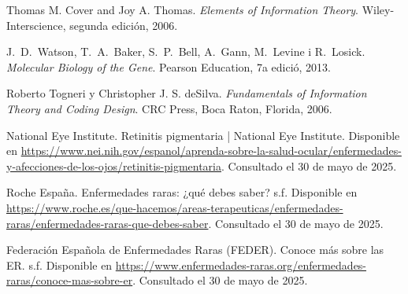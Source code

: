 \documentclass[11pt,spanish,listoffigures,listoftables]{tfgetsinf}
\begin{document}
\begin{thebibliography}{99}



   

   Thomas M. Cover and Joy A. Thomas.  
   \newblock \textit{Elements of Information Theory}.  
   \newblock Wiley-Interscience, segunda edición, 2006.

   J.~D.~Watson, T.~A.~Baker, S.~P.~Bell, A.~Gann, M.~Levine i R.~Losick.
   \newblock \textit{Molecular Biology of the Gene}.
   \newblock Pearson Education, 7a edició, 2013.
   
   Roberto Togneri y Christopher J. S. deSilva.  
   \newblock \textit{Fundamentals of Information Theory and Coding Design}.  
   \newblock CRC Press, Boca Raton, Florida, 2006.


   National Eye Institute.  
   \newblock Retinitis pigmentaria | National Eye Institute.  
   \newblock Disponible en  
   \url{https://www.nei.nih.gov/espanol/aprenda-sobre-la-salud-ocular/enfermedades-y-afecciones-de-los-ojos/retinitis-pigmentaria}.
   \newblock Consultado el 30 de mayo de 2025.

   Roche España.  
   \newblock Enfermedades raras: ¿qué debes saber?  
   \newblock s.f.  
   \newblock Disponible en  
   \url{https://www.roche.es/que-hacemos/areas-terapeuticas/enfermedades-raras/enfermedades-raras-que-debes-saber}.  
   \newblock Consultado el 30 de mayo de 2025.

   Federación Española de Enfermedades Raras (FEDER).  
   \newblock Conoce más sobre las ER.  
   \newblock s.f.  
   \newblock Disponible en  
   \url{https://www.enfermedades-raras.org/enfermedades-raras/conoce-mas-sobre-er}.  
   \newblock Consultado el 30 de mayo de 2025.



\end{thebibliography}
\end{document}
